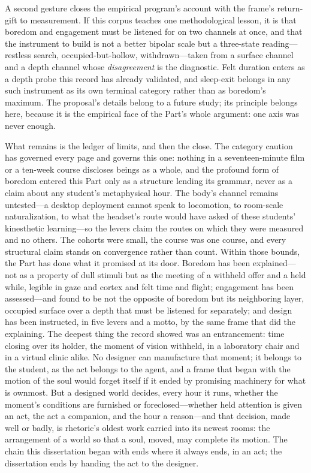 \documentclass{article}
\begin{document}
A second gesture closes the empirical program's account with the frame's return-gift to measurement. If this corpus teaches one methodological lesson, it is that boredom and engagement must be listened for on two channels at once, and that the instrument to build is not a better bipolar scale but a three-state reading---restless search, occupied-but-hollow, withdrawn---taken from a surface channel and a depth channel whose \textit{disagreement} is the diagnostic. Felt duration enters as a depth probe this record has already validated, and sleep-exit belongs in any such instrument as its own terminal category rather than as boredom's maximum. The proposal's details belong to a future study; its principle belongs here, because it is the empirical face of the Part's whole argument: one axis was never enough.

What remains is the ledger of limits, and then the close. The category caution has governed every page and governs this one: nothing in a seventeen-minute film or a ten-week course discloses beings as a whole, and the profound form of boredom entered this Part only as a structure lending its grammar, never as a claim about any student's metaphysical hour. The body's channel remains untested---a desktop deployment cannot speak to locomotion, to room-scale naturalization, to what the headset's route would have asked of these students' kinesthetic learning---so the levers claim the routes on which they were measured and no others. The cohorts were small, the course was one course, and every structural claim stands on convergence rather than count. Within those bounds, the Part has done what it promised at its door. Boredom has been explained---not as a property of dull stimuli but as the meeting of a withheld offer and a held while, legible in gaze and cortex and felt time and flight; engagement has been assessed---and found to be not the opposite of boredom but its neighboring layer, occupied surface over a depth that must be listened for separately; and design has been instructed, in five levers and a motto, by the same frame that did the explaining. The deepest thing the record showed was an entrancement: time closing over its holder, the moment of vision withheld, in a laboratory chair and in a virtual clinic alike. No designer can manufacture that moment; it belongs to the student, as the act belongs to the agent, and a frame that began with the motion of the soul would forget itself if it ended by promising machinery for what is ownmost. But a designed world decides, every hour it runs, whether the moment's conditions are furnished or foreclosed---whether held attention is given an act, the act a companion, and the hour a reason---and that decision, made well or badly, is rhetoric's oldest work carried into its newest rooms: the arrangement of a world so that a soul, moved, may complete its motion. The chain this dissertation began with ends where it always ends, in an act; the dissertation ends by handing the act to the designer.
\end{document}
